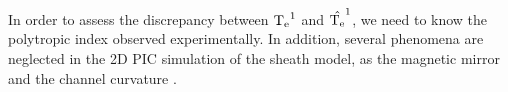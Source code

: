     In order to assess the discrepancy between  $\mathrm{T_e}^1$ and $\hat{\mathrm{T_e}}^1$, we need to know the polytropic index observed experimentally.
    In addition, several phenomena are neglected in the \ac{2D} \ac{PIC} simulation of the sheath model, as the magnetic mirror and the channel curvature \citep{heron2013,dominguez-vazquez2018}.
    
    